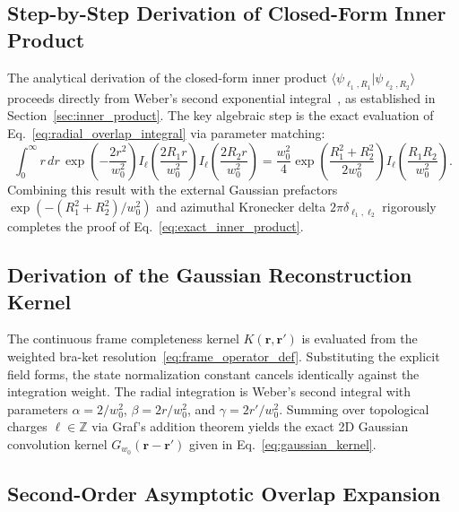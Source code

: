 \documentclass{optica-article}
\begin{document}
\subsection{Step-by-Step Derivation of Closed-Form Inner Product}

The analytical derivation of the closed-form inner product $\langle \psi_{\ell_1, R_1} | \psi_{\ell_2, R_2} \rangle$ proceeds directly from Weber's second exponential integral~\cite{Gradshteyn2014}, as established in Section~\ref{sec:inner_product}. The key algebraic step is the exact evaluation of Eq.~\eqref{eq:radial_overlap_integral} via parameter matching:
\begin{equation}
\int_0^\infty r \, dr \, \exp\left( - \frac{2 r^2}{w_0^2} \right) I_\ell\left( \frac{2 R_1 r}{w_0^2} \right) I_\ell\left( \frac{2 R_2 r}{w_0^2} \right) = \frac{w_0^2}{4} \exp\left( \frac{R_1^2 + R_2^2}{2 w_0^2} \right) I_\ell\left( \frac{R_1 R_2}{w_0^2} \right).
\label{eq:app_weber_evaluated}
\end{equation}
Combining this result with the external Gaussian prefactors $\exp(-(R_1^2 + R_2^2)/w_0^2)$ and azimuthal Kronecker delta $2\pi \delta_{\ell_1, \ell_2}$ rigorously completes the proof of Eq.~\eqref{eq:exact_inner_product}.

\subsection{Derivation of the Gaussian Reconstruction Kernel}

The continuous frame completeness kernel $K(\mathbf{r}, \mathbf{r}')$ is evaluated from the weighted bra-ket resolution~\eqref{eq:frame_operator_def}. Substituting the explicit field forms, the state normalization constant cancels identically against the integration weight. The radial integration is Weber's second integral with parameters $\alpha = 2/w_0^2$, $\beta = 2r/w_0^2$, and $\gamma = 2r'/w_0^2$. Summing over topological charges $\ell \in \mathbb{Z}$ via Graf's addition theorem yields the exact 2D Gaussian convolution kernel $G_{w_0}(\mathbf{r} - \mathbf{r}')$ given in Eq.~\eqref{eq:gaussian_kernel}.

\subsection{Second-Order Asymptotic Overlap Expansion}
\end{document}
